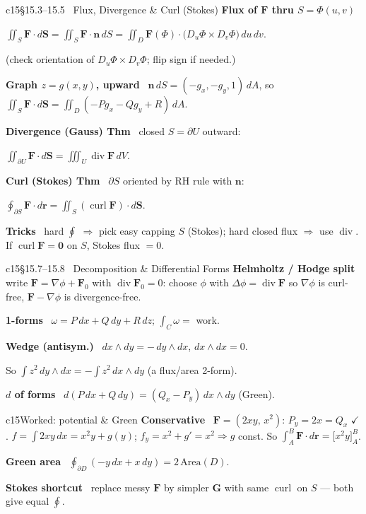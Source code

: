 \documentclass[10pt]{extarticle}
\newcommand{\h}[1]{{\bfseries #1}\ }
\newcommand{\key}[1]{\colorbox{hl}{$#1$}}
\newcommand{\grad}{\nabla}
\renewcommand{\div}{\operatorname{div}}
\newcommand{\curl}{\operatorname{curl}}
\newcommand{\F}{\mathbf{F}}
\newcommand{\n}{\mathbf{n}}
\newcommand{\rr}{\mathbf{r}}
\begin{document}
\begin{multicols}{2}
\begin{tbox}{c15}{§15.3--15.5 \ Flux, Divergence \& Curl (Stokes)}
\h{Flux of $\F$ thru $S=\Phi(u,v)$}\par
$\displaystyle\iint_S \F\cdot d\mathbf S=\iint_S \F\cdot\n\,dS=\iint_D \F(\Phi)\cdot\big(D_u\Phi\times D_v\Phi\big)\,du\,dv$.\par
(check orientation of $D_u\Phi\times D_v\Phi$; flip sign if needed.)\par
\h{Graph $z=g(x,y)$, upward} $\n\,dS=(-g_x,-g_y,1)\,dA$, so \key{\textstyle\iint_S\F\cdot d\mathbf S=\iint_D(-Pg_x-Qg_y+R)\,dA}.\par
\h{Divergence (Gauss) Thm} closed $S=\partial U$ outward:\par
\key{\textstyle\iint_{\partial U}\F\cdot d\mathbf S=\iiint_U \div\F\,dV}.\par
\h{Curl (Stokes) Thm} $\partial S$ oriented by RH rule with $\n$:\par
\key{\textstyle\oint_{\partial S}\F\cdot d\rr=\iint_S(\curl\F)\cdot d\mathbf S}.\par
\h{Tricks} hard $\oint$ $\Rightarrow$ pick easy capping $S$ (Stokes); hard closed flux $\Rightarrow$ use $\div$. If $\curl\F=\mathbf0$ on $S$, Stokes flux $=0$.
\end{tbox}

\begin{tbox}{c15}{§15.7--15.8 \ Decomposition \& Differential Forms}
\h{Helmholtz / Hodge split} write $\F=\grad\phi+\F_0$ with $\div\F_0=0$: choose $\phi$ with $\Delta\phi=\div\F$ so $\grad\phi$ is curl-free, $\F-\grad\phi$ is divergence-free.\par
\h{1-forms} $\omega=P\,dx+Q\,dy+R\,dz$; $\int_C\omega=$ work.\par
\h{Wedge (antisym.)} $dx\wedge dy=-\,dy\wedge dx$,\; $dx\wedge dx=0$.\par
So $\int z^2\,dy\wedge dx=-\!\int z^2\,dx\wedge dy$ (a flux/area 2-form).\par
\h{$d$ of forms} $d(P\,dx+Q\,dy)=(Q_x-P_y)\,dx\wedge dy$ (Green).
\end{tbox}

\begin{tbox}{c15}{Worked: potential \& Green}
\h{Conservative} $\F=(2xy,\,x^2)$: $P_y{=}2x{=}Q_x$ $\checkmark$. $f{=}\!\int\!2xy\,dx{=}x^2y{+}g(y)$; $f_y{=}x^2{+}g'{=}x^2\Rightarrow g$ const. So $\int_{A}^{B}\F\cdot d\rr=\big[x^2y\big]_A^B$.\par
\h{Green area} $\oint_{\partial D}(-y\,dx+x\,dy)=2\,\mathrm{Area}(D)$.\par
\h{Stokes shortcut} replace messy $\F$ by simpler $\mathbf G$ with same $\curl$ on $S$ — both give equal $\oint$.
\end{tbox}



\end{multicols}
\end{document}
